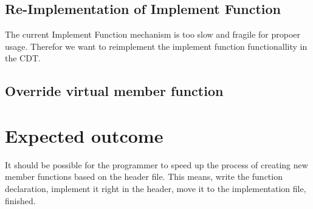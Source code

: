 \documentclass[a4paper,10pt]{scrreprt}
\begin{document}
\subsection{Re-Implementation of Implement Function}

The current Implement Function mechanism is too slow and fragile for propoer usage. Therefor we want to reimplement the implement function functionallity in the CDT.

\subsection{Override virtual member function}

\section{Expected outcome}

It should be possible for the programmer to speed up the process of creating new member functions based on the header file. This means, write the function declaration, implement it right in the header, move it to the implementation file, finished.
\end{document}
